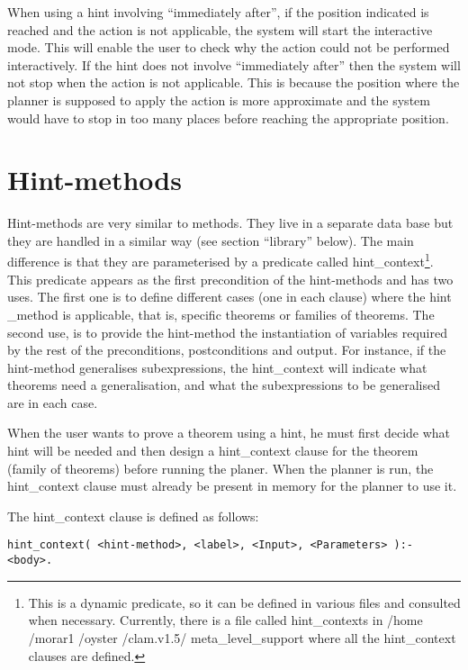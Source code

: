	When using a hint involving ``immediately after'', if the
position indicated is reached and the action is not applicable, the
system will start the interactive mode. This will enable the user to
check why the action could not be performed interactively. If the hint
does not involve ``immediately after'' then the system will not stop
when the action is not applicable. This is because the position where
the planner is supposed to apply the action is more approximate and
the system would have to stop in too many places before reaching the
appropriate position.

\section{Hint-methods}

        Hint-methods are very similar to methods. They live in a
separate data base but they are handled in a similar way (see section
``library'' below).  The main difference is that they are parameterised
by a predicate called hint\_context\footnote{This is a dynamic
predicate, so it can be defined in various files and consulted when
necessary. Currently, there is a file called hint\_contexts in /home
/morar1 /oyster /clam.v1.5/ meta\_level\_support where all the
hint\_context clauses are defined.}.  This predicate appears as the
first precondition of the hint-methods and has two uses. The first one
is to define different cases (one in each clause) where the hint
\_method is applicable, that is, specific theorems or families of
theorems. The second use, is to provide the hint-method the
instantiation of variables required by the rest of the preconditions,
postconditions and output. For instance, if the hint-method
generalises subexpressions, the hint\_context will indicate what
theorems need a generalisation, and what the subexpressions to be
generalised are in each case. 

        When the user wants to prove a theorem using a hint, he must
first decide what hint will be needed and then design a hint\_context
clause for the theorem (family of theorems) before running the planer.
When the planner is run, the hint\_context clause must already be present
in memory for the planner to use it.

        The hint\_context clause is defined as follows:

\begin{verbatim}
hint_context( <hint-method>, <label>, <Input>, <Parameters> ):- <body>.
\end{verbatim}

